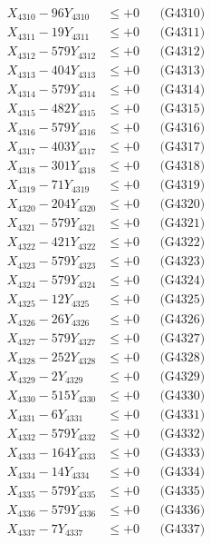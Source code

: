 \documentclass[a4paper,10pt]{article}
\begin{document}
{\begin{align}
X_{4310} - 96Y_{4310} &\leq +0 && \text{(G4310)} \\
\allowbreak
X_{4311} - 19Y_{4311} &\leq +0 && \text{(G4311)} \\
X_{4312} - 579Y_{4312} &\leq +0 && \text{(G4312)} \\
X_{4313} - 404Y_{4313} &\leq +0 && \text{(G4313)} \\
X_{4314} - 579Y_{4314} &\leq +0 && \text{(G4314)} \\
X_{4315} - 482Y_{4315} &\leq +0 && \text{(G4315)} \\
X_{4316} - 579Y_{4316} &\leq +0 && \text{(G4316)} \\
X_{4317} - 403Y_{4317} &\leq +0 && \text{(G4317)} \\
X_{4318} - 301Y_{4318} &\leq +0 && \text{(G4318)} \\
X_{4319} - 71Y_{4319} &\leq +0 && \text{(G4319)} \\
X_{4320} - 204Y_{4320} &\leq +0 && \text{(G4320)} \\
\allowbreak
X_{4321} - 579Y_{4321} &\leq +0 && \text{(G4321)} \\
X_{4322} - 421Y_{4322} &\leq +0 && \text{(G4322)} \\
X_{4323} - 579Y_{4323} &\leq +0 && \text{(G4323)} \\
X_{4324} - 579Y_{4324} &\leq +0 && \text{(G4324)} \\
X_{4325} - 12Y_{4325} &\leq +0 && \text{(G4325)} \\
X_{4326} - 26Y_{4326} &\leq +0 && \text{(G4326)} \\
X_{4327} - 579Y_{4327} &\leq +0 && \text{(G4327)} \\
X_{4328} - 252Y_{4328} &\leq +0 && \text{(G4328)} \\
X_{4329} - 2Y_{4329} &\leq +0 && \text{(G4329)} \\
X_{4330} - 515Y_{4330} &\leq +0 && \text{(G4330)} \\
\allowbreak
X_{4331} - 6Y_{4331} &\leq +0 && \text{(G4331)} \\
X_{4332} - 579Y_{4332} &\leq +0 && \text{(G4332)} \\
X_{4333} - 164Y_{4333} &\leq +0 && \text{(G4333)} \\
X_{4334} - 14Y_{4334} &\leq +0 && \text{(G4334)} \\
X_{4335} - 579Y_{4335} &\leq +0 && \text{(G4335)} \\
X_{4336} - 579Y_{4336} &\leq +0 && \text{(G4336)} \\
X_{4337} - 7Y_{4337} &\leq +0 && \text{(G4337)} \\

\end{align}}
\end{document}
